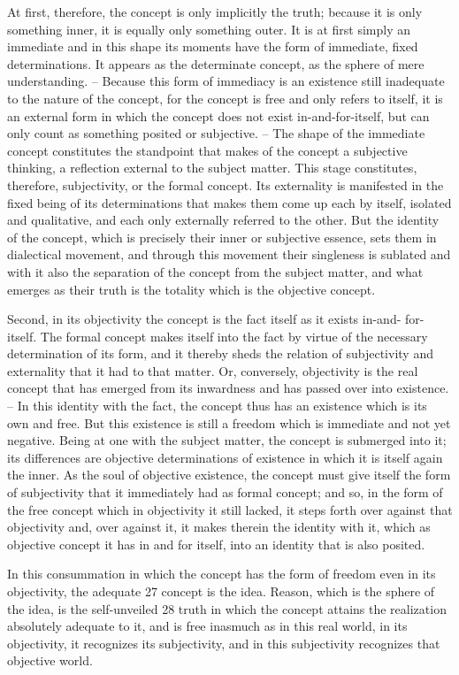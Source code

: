 At first, therefore, the concept is only implicitly the truth;
because it is only something inner, it is equally only something outer.
It is at first simply
an immediate and in this shape its moments have the form of immediate,
fixed determinations. It appears as the determinate concept, as the sphere of
mere understanding. – Because this form of immediacy is an existence still
inadequate to the nature of the concept, for the concept is free and only
refers to itself, it is an external form in which the concept does not exist
in-and-for-itself, but can only count as something posited or subjective. –
The shape of the immediate concept constitutes the standpoint that makes
of the concept a subjective thinking, a reflection external to the subject
matter. This stage constitutes, therefore, subjectivity, or the formal concept.
Its externality is manifested in the fixed being of its determinations that
makes them come up each by itself, isolated and qualitative, and each only
externally referred to the other. But the identity of the concept, which is
precisely their inner or subjective essence, sets them in dialectical movement,
and through this movement their singleness is sublated and with it also
the separation of the concept from the subject matter, and what emerges
as their truth is the totality which is the objective concept.

Second, in its objectivity the concept is the fact itself as it exists in-and-
for-itself. The formal concept makes itself into the fact by virtue of the
necessary determination of its form, and it thereby sheds the relation
of subjectivity and externality that it had to that matter. Or, conversely,
objectivity is the real concept that has emerged from its inwardness and has
passed over into existence. – In this identity with the fact, the concept
thus has an existence which is its own and free. But this existence is still a
freedom which is immediate and not yet negative. Being at one with the
subject matter, the concept is submerged into it; its differences are objective
determinations of existence in which it is itself again the inner. As the soul
of objective existence, the concept must give itself the form of subjectivity
that it immediately had as formal concept; and so, in the form of the free
concept which in objectivity it still lacked, it steps forth over against that
objectivity and, over against it, it makes therein the identity with it, which
as objective concept it has in and for itself, into an identity that is also posited.

In this consummation in which the concept has the form of freedom
even in its objectivity, the adequate 27 concept is the idea. Reason, which is
the sphere of the idea, is the self-unveiled 28 truth in which the concept
attains the realization absolutely adequate to it, and is free inasmuch as in
this real world, in its objectivity, it recognizes its subjectivity, and in this
subjectivity recognizes that objective world.

